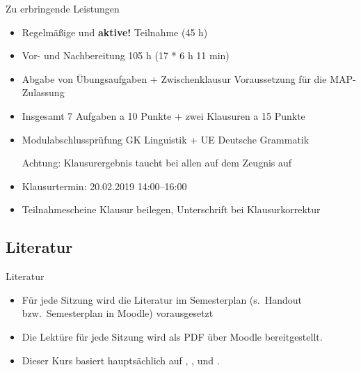 \begin{frame}{Zu erbringende Leistungen}

	\begin{itemize}
	\item Regelmäßige und \textbf{aktive!} Teilnahme (45 h)
        \item Vor- und Nachbereitung 105 h (17 * 6 h 11 min)
	\item Abgabe von Übungsaufgaben + Zwischenklausur \ras Voraussetzung für die MAP-Zulassung

        \item Insgesamt 7 Aufgaben a 10 Punkte + zwei Klausuren a 15 Punkte

	\item Modulabschlussprüfung \ras GK Linguistik + UE Deutsche Grammatik

              Achtung: Klausurergebnis taucht bei allen auf dem Zeugnis auf

        \item Klausurtermin: 20.02.2019 14:00--16:00
        \item Teilnahmescheine Klausur beilegen, Unterschrift bei Klausurkorrektur
              
	\end{itemize}
	
\end{frame}


%
\subsection{Literatur}

\begin{frame}{Literatur}

\begin{itemize}
	\item Für jede Sitzung wird die Literatur im Semesterplan (s.\ Handout bzw.\ Semesterplan in Moodle) vorausgesetzt
	\item Die Lektüre für jede Sitzung wird als PDF über Moodle bereitgestellt.
\bigskip

	\item Dieser Kurs basiert hauptsächlich auf , ,  und .
\end{itemize}		

\end{frame}

